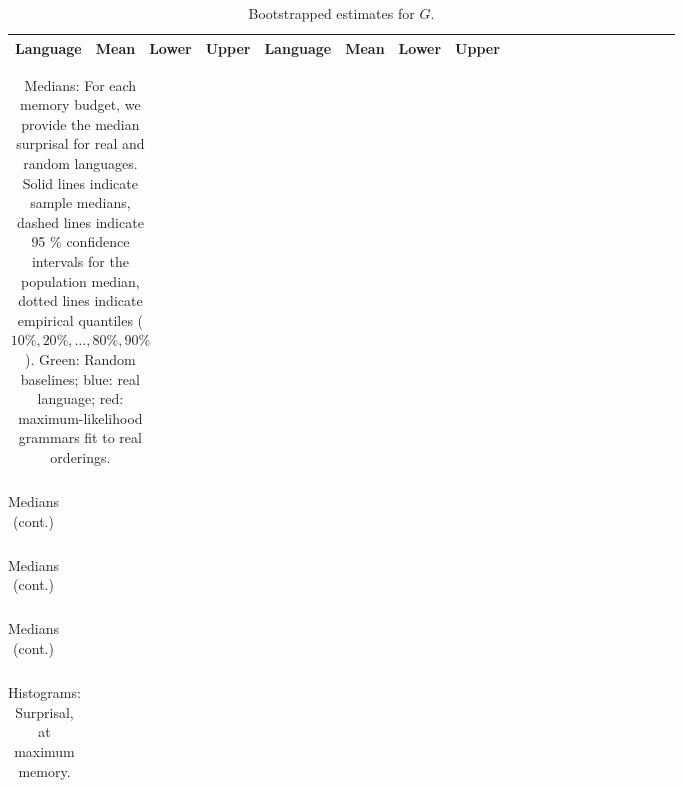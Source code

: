 \documentclass[11pt,letterpaper]{article}
\begin{document}
\begin{table}[!htbp]
\begin{longtable}{l|lll||l|lllllllllllllll}
	Language & Mean & Lower & Upper & Language & Mean & Lower & Upper \\ \hline

\end{longtable}
	\caption{Bootstrapped estimates for $G$.}\label{tab:boot-g}
\end{table}



\begin{table}[!htbp]
\begin{longtable}{ccccccccccccccclll}

\end{longtable}
	\caption{Medians: For each memory budget, we provide the median surprisal for real and random languages. Solid lines indicate sample medians, dashed lines indicate 95 $\%$ confidence intervals for the population median, dotted lines indicate empirical quantiles ($10\%, 20\%, \dots, 80\%, 90\%$). Green: Random baselines; blue: real language; red: maximum-likelihood grammars fit to real orderings.}\label{tab:medians}
\end{table}

\begin{table}[!htbp]
\begin{longtable}{ccccccccccccccclll}

\end{longtable}
	\caption{Medians (cont.)}
\end{table}

\begin{table}[!htbp]
\begin{longtable}{ccccccccccccccclll}

\end{longtable}
	\caption{Medians (cont.)}
\end{table}

\begin{table}[!htbp]
\begin{longtable}{ccccccccccccccclll}

\end{longtable}
	\caption{Medians (cont.)}
\end{table}







\begin{table}[!htbp]
\begin{tabular}{ccccccccccccccclll}

\end{tabular}
	\caption{Histograms: Surprisal, at maximum memory.}\label{tab:slice-hists-real}
\end{table}
\end{document}
